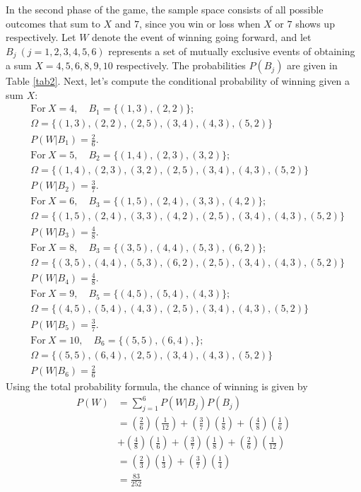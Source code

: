 \documentclass[aps,twocolumn,floatfix, nofootinbib, superscriptaddress]{revtex4-1}
\begin{document}
\begin{enumerate}
     In the second phase of the game, the sample space consists of all possible outcomes that sum to $X$ and $7$, since you win or loss when $X$ or $7$ shows up respectively.   Let $W$ denote the event of winning going forward, and let $B_j~(j = 1,2,3,4,5,6)$ represents a set of mutually exclusive events of obtaining a sum $X = 4,5,6,8,9,10$ respectively. The probabilities $P(B_j)$ are given in Table \ref{tab2}. Next, let's compute the conditional probability of winning given a sum $X$:
     \begin{align}
     &\text {For}~ X = 4, \quad B_1 = \lbrace (1,3), (2,2)\rbrace; \nonumber\\& \Omega = \lbrace (1,3), (2,2),(2,5),(3,4),(4,3), (5,2)\rbrace \nonumber \\& P(W|B_1) = \frac{2}{6}.\\&
     \text {For}~ X = 5, \quad B_2 = \lbrace (1,4), (2,3), (3,2)\rbrace; \nonumber\\&\Omega = \lbrace (1,4), (2,3), (3,2),(2,5),(3,4),(4,3), (5,2)\rbrace \nonumber \\& P(W|B_2) = \frac{3}{7}.\\&
     \text {For}~  X = 6, \quad B_3 = \lbrace (1,5), (2,4), (3,3), (4,2)\rbrace; \nonumber\\&\Omega = \lbrace (1,5), (2,4), (3,3), (4,2),(2,5),(3,4),(4,3), (5,2)\rbrace\nonumber \\&P(W|B_3) = \frac{4}{8}.\\&
      \text {For}~ X = 8, \quad B_3 = \lbrace (3,5), (4,4), (5,3), (6,2)\rbrace; \nonumber\\&\Omega = \lbrace (3,5), (4,4), (5,3), (6,2),(2,5),(3,4),(4,3), (5,2)\rbrace\nonumber \\&P(W|B_4) = \frac{4}{8}.\\&
    \text {For}~   X = 9, \quad B_5 = \lbrace (4,5), (5,4), (4,3)\rbrace; \nonumber\\&\Omega = \lbrace (4,5), (5,4), (4,3),(2,5),(3,4),(4,3), (5,2)\rbrace\nonumber \\&P(W|B_5) = \frac{3}{7}.\\&
    \text {For}~   X = 10, \quad B_6 = \lbrace (5,5), (6,4),\rbrace; \nonumber\\&\Omega = \lbrace  (5,5), (6,4),(2,5),(3,4),(4,3), (5,2)\rbrace\nonumber \\&P(W|B_6) = \frac{2}{6}
     \end{align}
     Using the total probability formula, the chance of winning is given by
     \begin{align}
     	P(W)  &= \sum_{j=1}^{6}P(W|B_j)P(B_j) \nonumber\\& =\left(\frac{2}{6}\right)\left(\frac{1}{12}\right)+\left(\frac{3}{7}\right)\left(\frac{1}{8}\right) + \left(\frac{4}{8}\right)\left(\frac{1}{6}\right)  \nonumber\\&+ \left(\frac{4}{8}\right)\left(\frac{1}{6}\right) + \left(\frac{3}{7}\right)\left(\frac{1}{8}\right) + \left(\frac{2}{6}\right)\left(\frac{1}{12}\right) \nonumber\\& = \left(\frac{2}{3}\right)\left(\frac{1}{3}\right) + \left(\frac{3}{7}\right)\left(\frac{1}{4}\right)  \nonumber\\&= \frac{83}{252}

\end{align}
\end{enumerate}
\end{document}
